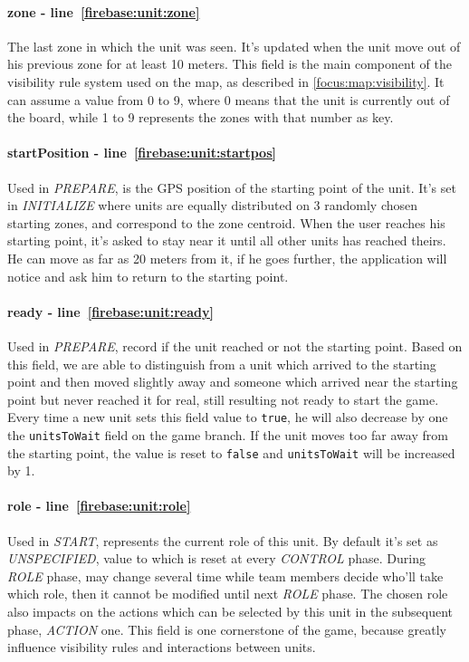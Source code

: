 				\paragraph{zone - line~\ref{firebase:unit:zone}}
				The last zone in which the unit was seen. It's updated when the unit move out of his previous zone for at least 10 meters. This field is the main component of the visibility rule system used on the map, as described in \autoref{focus:map:visibility}. It can assume a value from 0 to 9, where 0 means that the unit is currently out of the board, while 1 to 9 represents the zones with that number as key.
				
				\paragraph{startPosition - line~\ref{firebase:unit:startpos}}
				Used in \emph{PREPARE}, is the GPS position of the starting point of the unit. It's set in \emph{INITIALIZE} where units are equally distributed on 3 randomly chosen starting zones, and correspond to the zone centroid.
				When the user reaches his starting point, it's asked to stay near it until all other units has reached theirs. He can move as far as 20 meters from it, if he goes further, the application will notice and ask him to return to the starting point.
				
				\paragraph{ready - line~\ref{firebase:unit:ready}}
				Used in \emph{PREPARE}, record if the unit reached or not the starting point. Based on this field, we are able to distinguish from a unit which arrived to the starting point and then moved slightly away and someone which arrived near the starting point but never reached it for real, still resulting not ready to start the game. Every time a new unit sets this field value to \lstinline|true|, he will also decrease by one the \lstinline|unitsToWait| field on the game branch.
				If the unit moves too far away from the starting point, the value is reset to \lstinline|false| and \lstinline|unitsToWait| will be increased by 1. 
				
				\paragraph{role - line~\ref{firebase:unit:role}}
				Used in \emph{START}, represents the current role of this unit. By default it's set as \emph{UNSPECIFIED}, value to which is reset at every \emph{CONTROL} phase.
				During \emph{ROLE} phase, may change several time while team members decide who'll take which role, then it cannot be modified until next \emph{ROLE} phase.
				The chosen role also impacts on the actions which can be selected by this unit in the subsequent phase, \emph{ACTION} one.
				This field is one cornerstone of the game, because greatly influence visibility rules and interactions between units.
				
